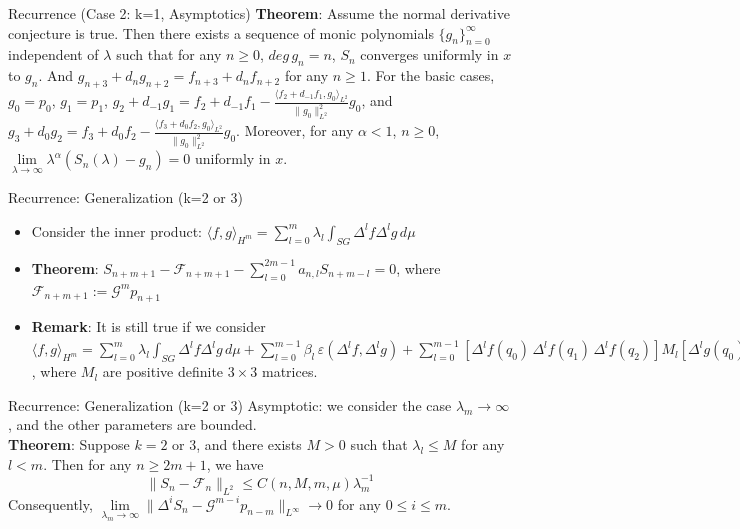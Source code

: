 \documentclass[xcolor = dvipsnames]{beamer}
\newcommand{\lap}{\Delta}
\begin{document}
\begin{frame}{Recurrence (Case 2: k=1, Asymptotics)}
    \textbf{Theorem}: Assume the normal derivative conjecture is true. Then there exists a sequence of monic polynomials $\{g_n\}_{n=0}^{\infty}$ independent of $\lambda$ such that for any $n\ge0$, $deg\, g_n=n$, $S_n$ converges uniformly in $x$ to $g_n$. And $g_{n+3}+d_ng_{n+2}=f_{n+3}+d_nf_{n+2}$ for any $n\ge 1$. For the basic cases, $g_0=p_0$, $g_1=p_1$, $g_{2}+d_{-1}g_{1}=f_{2}+d_{-1}f_{1}-\frac{\langle f_2+d_{-1}f_1,{g_0}\rangle_{L^2}}{{\|g_0\|_{L^2}^2}}g_{0}$, and 
$g_{3}+d_{0}g_{2}=f_{3}+d_{0}f_{2}-\frac{\langle f_3+d_{0}f_2,{g_0}\rangle_{L^2}}{{\|g_0\|_{L^2}^2}}g_{0}$. Moreover, for any $\alpha<1$, $n\ge0$, $\lim\limits_{\lambda \rightarrow\infty}\lambda^\alpha(S_n(\lambda)-g_n)=0$ uniformly in $x$.

\end{frame}
\begin{frame}{Recurrence: Generalization (k=2 or 3)}
\begin{itemize}
    \item Consider the inner product: $\langle f,g\rangle_{H^m} = \sum\limits_{l = 0}^m \lambda_l\int_{SG}\lap^lf\lap^lg\,d\mu$
    \pause
\item \textbf{Theorem}: $S_{n+m+1} - \mathcal{F}_{n+m+1} - \sum\limits_{l = 0}^{2m-1}a_{n, l}S_{n+m-l} = 0$, where $\mathcal{F}_{n+m+1} := \mathcal{G}^mp_{n+1}$
\pause
\item \textbf{Remark}: It is still true if we consider $\langle f,g\rangle_{H^m}= 
\sum\limits_{l = 0}^m \lambda_l\int_{SG}\lap^lf\lap^lg\,d\mu+\sum\limits_{l=0}^{m-1}\beta_l\,\varepsilon(\lap^l f,\lap^l g)+\nonumber
\sum\limits_{l=0}^{m-1}[\lap ^lf(q_0)\,\lap ^lf(q_1)\,\lap ^lf(q_2)] M_l [\lap ^lg(q_0)\,\lap ^lg(q_1)\,\lap ^lg(q_2)]^T$, where $M_l$ are positive definite $3\times 3$ matrices.

\end{itemize}
    
\end{frame}
\begin{frame}{Recurrence: Generalization (k=2 or 3)}
Asymptotic: we consider the case $\lambda_m\rightarrow\infty$, and the other parameters are bounded.\\
\textbf{Theorem}: Suppose $k=2$ or $3$, and there exists $M>0$ such that $\lambda_l\le M$ for any $l<m$. Then for any $n\ge 2m+1$, we have$$\|S_n-\mathcal{F}_n\|_{L^2}\le
   C(n,M,m,\mu)\lambda_m^{-1}$$ Consequently, $\lim\limits_{\lambda_m\rightarrow\infty}\|\lap^i S_n-\mathcal{G}^{m-i}p_{n-m}\|_{L^\infty}\rightarrow 0$ for any $0\le i\le m$.


\end{frame}
\end{document}
